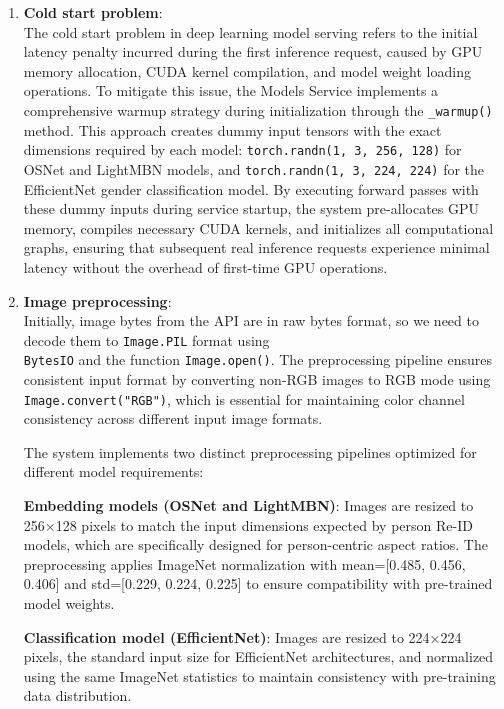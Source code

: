 \begin{enumerate}
    \item \textbf{Cold start problem}:\\
    The cold start problem in deep learning model serving refers to the initial latency penalty incurred during the first inference request, caused by GPU memory allocation, CUDA kernel compilation, and model weight loading operations. To mitigate this issue, the Models Service implements a comprehensive warmup strategy during initialization through the \texttt{\_warmup()} method. This approach creates dummy input tensors with the exact dimensions required by each model: \texttt{torch.randn(1, 3, 256, 128)} for OSNet and LightMBN models, and \texttt{torch.randn(1, 3, 224, 224)} for the EfficientNet gender classification model. By executing forward passes with these dummy inputs during service startup, the system pre-allocates GPU memory, compiles necessary CUDA kernels, and initializes all computational graphs, ensuring that subsequent real inference requests experience minimal latency without the overhead of first-time GPU operations.
    
    \item \textbf{Image preprocessing}:\\
    Initially, image bytes from the API are in raw bytes format, so we need to decode them to \texttt{Image.PIL} format using \\ \texttt{BytesIO} and the function \texttt{Image.open()}. The preprocessing pipeline ensures consistent input format by converting non-RGB images to RGB mode using \texttt{Image.convert("RGB")}, which is essential for maintaining color channel consistency across different input image formats.

    The system implements two distinct preprocessing pipelines optimized for different model requirements:
    
    \textbf{Embedding models (OSNet and LightMBN)}: Images are resized to 256×128 pixels to match the input dimensions expected by person Re-ID models, which are specifically designed for person-centric aspect ratios. The preprocessing applies ImageNet normalization with mean=[0.485, 0.456, 0.406] and std=[0.229, 0.224, 0.225] to ensure compatibility with pre-trained model weights.
    
    \textbf{Classification model (EfficientNet)}: Images are resized to 224×224 pixels, the standard input size for EfficientNet architectures, and normalized using the same ImageNet statistics to maintain consistency with pre-training data distribution.
    

\end{enumerate}
